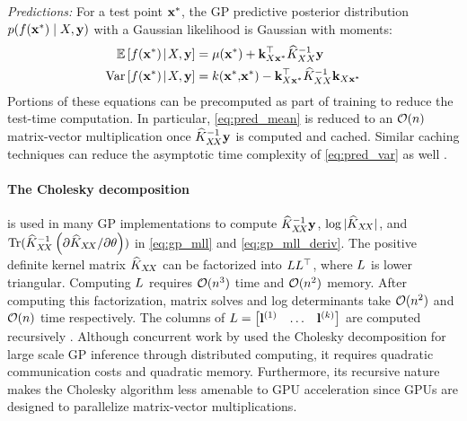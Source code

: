 \emph{Predictions:}
For a test point $\mathbf{x}^*$, the GP predictive posterior distribution $p( f(\mathbf{x}^*) \mid X, \mathbf{y} )$ with a Gaussian likelihood is Gaussian with moments:
%
\begin{align}
  \operatorname*{\mathbb{E}} \left[ f(\mathbf{x}^*) \! \mid \! X, \mathbf{y} \right] &= \mu(\mathbf{x}^*) + \mathbf{k}_{X\mathbf{x}^*}^\top \widehat{K}_{XX}^{-1}\mathbf{y}
  \label{eq:pred_mean}
  \\
  \operatorname*{Var} \left[ f(\mathbf{x}^*) \! \mid \! X, \mathbf{y} \right] &= k(\mathbf{x}^*, \! \mathbf{x}^*) - \mathbf{k}_{X\mathbf{x}^*}^\top \widehat{K}_{XX}^{-1}\mathbf{k}_{X\mathbf{x}^*}
  \label{eq:pred_var}
\end{align}
%
Portions of these equations can be precomputed as part of training to reduce the test-time computation.
In particular, \eqref{eq:pred_mean} is reduced to an $\bigo{n}$ matrix-vector multiplication once $\widehat {K}_{X \! X}^{-1}\mathbf{y}$ is computed and cached.
Similar caching techniques can reduce the asymptotic time complexity of \eqref{eq:pred_var} as well \cite{pleiss2018constant}.

\paragraph{The Cholesky decomposition} is used in many GP implementations to compute $\widehat {K}_{X \! X}^{-1} \mathbf{y}$, $\log \vert \widehat {K}_{X \! X} \vert$, and $\tr{ \widehat \bK_{\bX \! \bX}^{-1} \left( \partial \widehat \bK_{\bX \! \bX} / \partial \theta \right) }$ in \eqref{eq:gp_mll} and \eqref{eq:gp_mll_deriv}.
The positive definite kernel matrix $\widehat {K}_{X \! X}$ can be factorized
into $L L^\top$, where $L$ is lower triangular.
Computing $L$ requires $\bigo{n^3}$ time and $\bigo{n^2}$ memory.
After computing this factorization, matrix solves and log determinants take $\bigo{n^2}$ and $\bigo{n}$ time respectively.
The columns of $L = \begin{bmatrix} \mathbf{l}^{(1)} & \ldots & \mathbf{l}^{(k)} \end{bmatrix}$ are computed recursively \citep{golub2012matrix}.
Although concurrent work by \citep{nguyen2019exact} used the Cholesky
decomposition for large scale GP inference through distributed computing, it
requires quadratic communication costs and quadratic memory. Furthermore, its
recursive nature makes the Cholesky algorithm less amenable to GPU acceleration since
GPUs are designed to parallelize matrix-vector multiplications.

